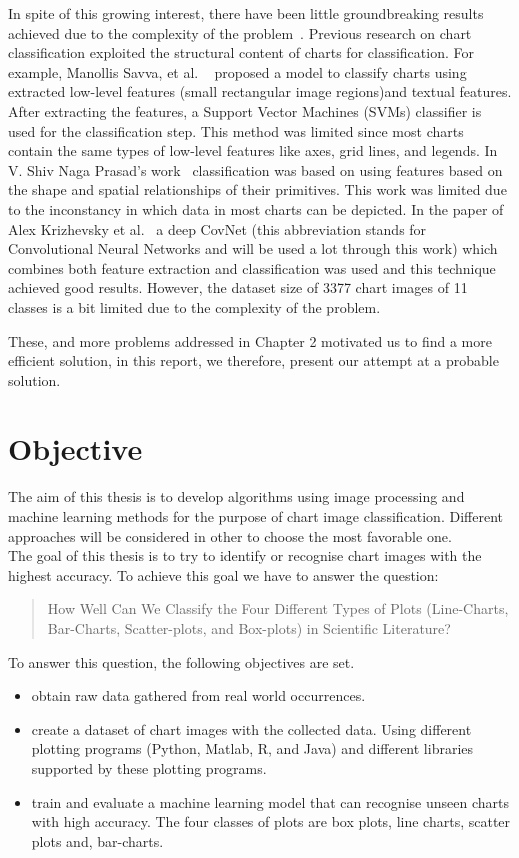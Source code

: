 \documentclass[12pt, a4paper,oneside]{report}
\begin{document}
In spite of this growing interest, there have been little groundbreaking results achieved due to the complexity of the problem~\cite{liu2015chart}. Previous research on chart classification exploited the structural content of charts for classification. For example, Manollis Savva, et al.  ~\cite{savva2011revision} proposed a model to classify charts
using extracted low-level features (small rectangular image regions)and textual features. After extracting the features, a  Support Vector Machines (SVMs) classifier is used for the classification step. This method was limited since most charts contain the same types of low-level features like axes, grid lines, and legends. In V. Shiv Naga Prasad's work~ \cite{prasad2007classifying} classification was based on using features based on the shape and spatial relationships of their primitives. This work was limited due to the inconstancy in which data in most charts can be depicted. In the paper of Alex Krizhevsky et al.~\cite{krizhevsky2012imagenet} a deep CovNet (this abbreviation stands for Convolutional Neural Networks and will be used a lot through this work) which combines both feature extraction and classification was used and this technique achieved good results. However, the dataset size of 3377 chart images of 11 classes is a bit limited due to the complexity of the problem. 

These, and more problems addressed in Chapter 2 motivated us to find a more efficient solution, in this report, we therefore, present our attempt at a probable solution.

\section{Objective}
The aim of this thesis is to develop algorithms using image processing and machine learning methods for the purpose of chart image classification. Different approaches will be considered in other to choose the most favorable one.\\
The goal of this thesis is to try to identify or recognise chart images with the highest accuracy. To achieve this goal we have to answer the question: \begin{quote} How Well Can We Classify the Four Different Types of Plots (Line-Charts, Bar-Charts, Scatter-plots, and Box-plots) in Scientific Literature? \end{quote} 
To answer this question, the following objectives are set.

\begin{itemize}\itemsep3pt
	\item obtain raw data gathered from real world occurrences.
	\item create a dataset of chart images with the collected data. Using  different plotting programs (Python, Matlab, R, and Java) and different libraries supported by these plotting programs.
	\item train and evaluate a machine learning model that can recognise unseen charts with high accuracy. The four classes of plots are box plots, line charts, scatter plots and, bar-charts.
\end{itemize}
\end{document}
